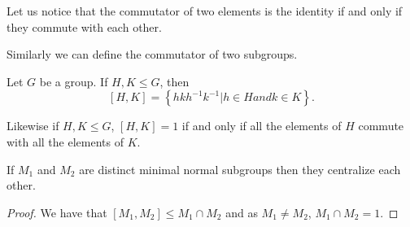 Let us notice that the commutator of two elements is the identity if and only if they commute with each other.

Similarly we can define the commutator of two subgroups.

\begin{definition}
    \label{S1:groupcommutator}
    Let $G$ be a group. If $H, K \le G$, then
    $$
    [H,K] = \left\{ hkh^{-1}k^{-1} | h \in H and k \in K \right\}.
    $$ 
\end{definition}

Likewise if $H,K \le G$, $[H,K] = 1$ if and only if all the elements of $H$ commute with all the elements of $K$.

\begin{theorem}
    \label{mnsubsc}
    If $M_1$ and $M_2$ are distinct minimal normal subgroups then they centralize each other.
\end{theorem}

\begin{proof}
    We have that $[ M_1, M_2] \le M_1 \cap M_2$ and as $M_1 \ne M_2$, $M_1 \cap M_2 = 1$.
\end{proof}